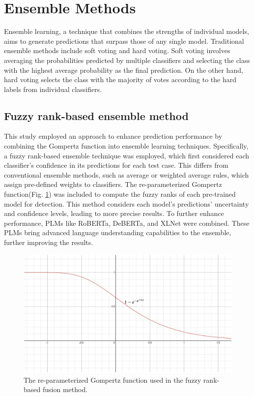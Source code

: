 \section{Ensemble Methods}
Ensemble learning, a technique that combines the strengths of individual models, aims to generate predictions that surpass those of any single model. Traditional ensemble methods include soft voting and hard voting. Soft voting involves averaging the probabilities predicted by multiple classifiers and selecting the class with the highest average probability as the final prediction. On the other hand, hard voting selects the class with the majority of votes according to the hard labels from individual classifiers.\\

\subsection{Fuzzy rank-based ensemble method}
This study employed an approach to enhance prediction performance by combining the Gompertz function into ensemble learning techniques. Specifically, a fuzzy rank-based ensemble technique\cite{b30} was employed, which first considered each classifier's confidence in its predictions for each test case. This differs from conventional ensemble methods, such as average or weighted average rules, which assign pre-defined weights to classifiers. The re-parameterized Gompertz function(Fig. \ref{fig:Gompertz}) was included to compute the fuzzy ranks of each pre-trained model for detection. This method considers each model's predictions' uncertainty and confidence levels, leading to more precise results. To further enhance performance, PLMs like RoBERTa, DeBERTa, and XLNet were combined. These PLMs bring advanced language understanding capabilities to the ensemble, further improving the results.\\
\begin{figure}
    \centering
    \includegraphics[width=1\linewidth]{img/Gompertz.png}
    \caption{The re-parameterized Gompertz function used in the fuzzy rank-based fusion method.\cite{b30}}
    \label{fig:Gompertz}
\end{figure}

